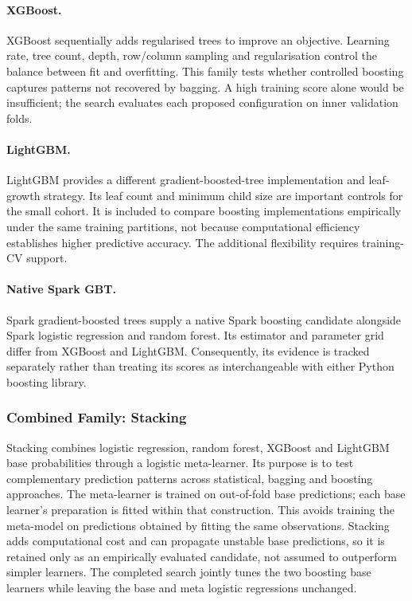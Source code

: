 \paragraph{XGBoost.} XGBoost sequentially adds regularised trees to improve an objective. Learning rate, tree count, depth, row/column sampling and regularisation control the balance between fit and overfitting. This family tests whether controlled boosting captures patterns not recovered by bagging. A high training score alone would be insufficient; the search evaluates each proposed configuration on inner validation folds.

\paragraph{LightGBM.} LightGBM provides a different gradient-boosted-tree implementation and leaf-growth strategy. Its leaf count and minimum child size are important controls for the small cohort. It is included to compare boosting implementations empirically under the same training partitions, not because computational efficiency establishes higher predictive accuracy. The additional flexibility requires training-CV support.

\paragraph{Native Spark GBT.} Spark gradient-boosted trees supply a native Spark boosting candidate alongside Spark logistic regression and random forest. Its estimator and parameter grid differ from XGBoost and LightGBM. Consequently, its evidence is tracked separately rather than treating its scores as interchangeable with either Python boosting library.

\subsubsection{Combined Family: Stacking}
Stacking combines logistic regression, random forest, XGBoost and LightGBM base probabilities through a logistic meta-learner. Its purpose is to test complementary prediction patterns across statistical, bagging and boosting approaches. The meta-learner is trained on out-of-fold base predictions; each base learner's preparation is fitted within that construction. This avoids training the meta-model on predictions obtained by fitting the same observations. Stacking adds computational cost and can propagate unstable base predictions, so it is retained only as an empirically evaluated candidate, not assumed to outperform simpler learners. The completed search jointly tunes the two boosting base learners while leaving the base and meta logistic regressions unchanged.

